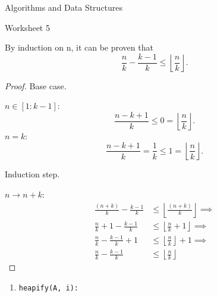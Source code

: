 \documentclass{article}
\begin{document}
    {Algorithms and Data Structures}

    \begin{center}
        \LARGE
        Worksheet 5
    \end{center}
    \begin{tasks}
        \item {
            By induction on n, it can be proven that
            \begin{displaymath}
                \frac{n}{k}-\frac{k-1}{k}\leq\left\lfloor\frac{n}{k}\right\rfloor.
            \end{displaymath}

            \begin{proof}
                Base case. 

                \(n\in[1:k-1]\):
                \begin{displaymath}
                    \frac{n-k+1}{k}\leq0=\left\lfloor\frac{n}{k}\right\rfloor.
                \end{displaymath}
                \(n = k\):
                \begin{displaymath}
                    \frac{n-k+1}{k}=\frac{1}{k}\leq1=\left\lfloor\frac{n}{k}\right\rfloor.
                \end{displaymath}
                
                Induction step. 
                
                \(n\to n+k\):
                \begin{displaymath}
                    \begin{aligned}
                        \frac{(n+k)}{k}-\frac{k-1}{k}&\leq\left\lfloor\frac{(n+k)}{k}\right\rfloor \implies \\
                        \frac{n}{k}+1-\frac{k-1}{k}&\leq\left\lfloor\frac{n}{k}+1\right\rfloor \implies \\
                        \frac{n}{k}-\frac{k-1}{k}+1&\leq\left\lfloor\frac{n}{k}\right\rfloor+1 \implies \\
                        \frac{n}{k}-\frac{k-1}{k}&\leq\left\lfloor\frac{n}{k}\right\rfloor
                    \end{aligned}
                \end{displaymath}
            \end{proof}
        }
        \item {
            \begin{enumerate}[label={(\arabic*)}]
                \item {
                    \begin{verbatim}
heapify(A, i):


\end{verbatim}}
\end{enumerate}}
\end{tasks}
\end{document}
